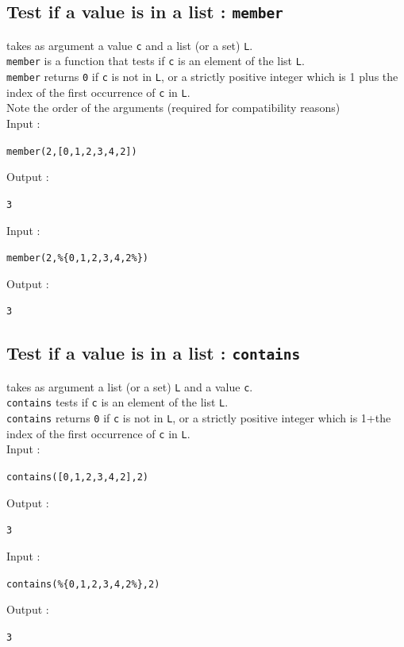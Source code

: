 \documentclass[a4paper,11pt]{book}
\begin{document}
\subsection{Test if a value is in a list : {\tt member}}
 takes as argument a value {\tt c} and a list
(or a set) {\tt L}.\\
{\tt member} is a function that tests if {\tt c} is an element of the 
list {\tt L}.\\
{\tt member} returns {\tt 0} if {\tt c} is not in {\tt L}, or
a strictly positive integer which is 
1 plus the index of the first occurrence of {\tt c} in {\tt L}.\\
Note the order of the arguments (required for compatibility reasons)\\
Input :
\begin{center}{\tt member(2,[0,1,2,3,4,2])}\end{center}
Output :
\begin{center}{\tt  3}\end{center}
Input :
\begin{center}{\tt member(2,\%\{0,1,2,3,4,2\%\})}\end{center}
Output :
\begin{center}{\tt  3}\end{center}

\subsection{Test if a value is in a list : {\tt contains}}
  takes as argument a list (or a set) 
{\tt L} and a value {\tt c}.\\
{\tt contains} tests if {\tt c} is an element of the list {\tt L}.\\
 {\tt contains} returns {\tt 0} if {\tt c} is not in {\tt L}, 
or a strictly positive integer which is  
1+the index of the first occurrence of {\tt c} in {\tt L}.\\
Input :
\begin{center}{\tt contains([0,1,2,3,4,2],2)}\end{center}
Output :
\begin{center}{\tt  3}\end{center}
Input :
\begin{center}{\tt contains(\%\{0,1,2,3,4,2\%\},2)}\end{center}
Output :
\begin{center}{\tt  3}\end{center}
\end{document}
